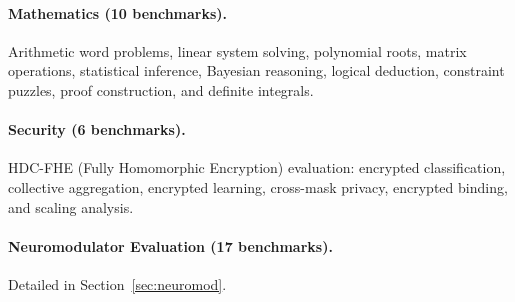 \documentclass[11pt,letterpaper]{article}
\begin{document}
\paragraph{Mathematics (10 benchmarks).} Arithmetic word problems, linear system solving, polynomial roots, matrix operations, statistical inference, Bayesian reasoning, logical deduction, constraint puzzles, proof construction, and definite integrals.

\paragraph{Security (6 benchmarks).} HDC-FHE (Fully Homomorphic Encryption) evaluation: encrypted classification, collective aggregation, encrypted learning, cross-mask privacy, encrypted binding, and scaling analysis.

\paragraph{Neuromodulator Evaluation (17 benchmarks).} Detailed in Section~\ref{sec:neuromod}.
\end{document}
